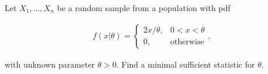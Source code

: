 
\begin{exercise}

Let $X_1,\dots,X_n$ be a random sample from a population with pdf

\begin{align*}
  f(x|\theta) = \begin{cases}
    2x/\theta, & 0 < x < \theta \\
    0, & \text{otherwise}
  \end{cases},
\end{align*}

with unknown parameter $\theta > 0$. Find a minimal sufficient statistic
for $\theta$.
\end{exercise}


\begin{solution}

\phantom{}

\end{solution}

